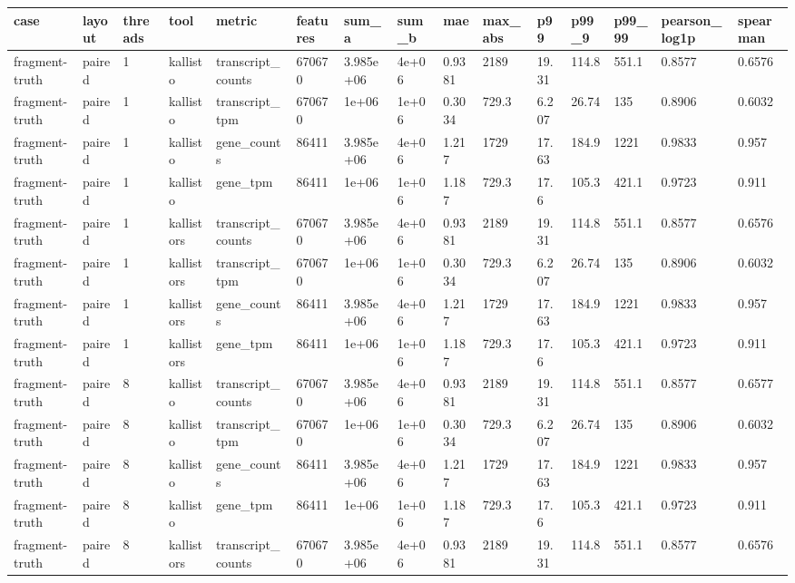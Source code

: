 \begin{tabular}{lllllllllllllll}
\toprule
case & layout & threads & tool & metric & features & sum\_a & sum\_b & mae & max\_abs & p99 & p99\_9 & p99\_99 & pearson\_log1p & spearman \\
\midrule
fragment-truth & paired & 1 & kallisto & transcript\_counts & 670670 & 3.985e+06 & 4e+06 & 0.9381 & 2189 & 19.31 & 114.8 & 551.1 & 0.8577 & 0.6576 \\
fragment-truth & paired & 1 & kallisto & transcript\_tpm & 670670 & 1e+06 & 1e+06 & 0.3034 & 729.3 & 6.207 & 26.74 & 135 & 0.8906 & 0.6032 \\
fragment-truth & paired & 1 & kallisto & gene\_counts & 86411 & 3.985e+06 & 4e+06 & 1.217 & 1729 & 17.63 & 184.9 & 1221 & 0.9833 & 0.957 \\
fragment-truth & paired & 1 & kallisto & gene\_tpm & 86411 & 1e+06 & 1e+06 & 1.187 & 729.3 & 17.6 & 105.3 & 421.1 & 0.9723 & 0.911 \\
fragment-truth & paired & 1 & kallistors & transcript\_counts & 670670 & 3.985e+06 & 4e+06 & 0.9381 & 2189 & 19.31 & 114.8 & 551.1 & 0.8577 & 0.6576 \\
fragment-truth & paired & 1 & kallistors & transcript\_tpm & 670670 & 1e+06 & 1e+06 & 0.3034 & 729.3 & 6.207 & 26.74 & 135 & 0.8906 & 0.6032 \\
fragment-truth & paired & 1 & kallistors & gene\_counts & 86411 & 3.985e+06 & 4e+06 & 1.217 & 1729 & 17.63 & 184.9 & 1221 & 0.9833 & 0.957 \\
fragment-truth & paired & 1 & kallistors & gene\_tpm & 86411 & 1e+06 & 1e+06 & 1.187 & 729.3 & 17.6 & 105.3 & 421.1 & 0.9723 & 0.911 \\
fragment-truth & paired & 8 & kallisto & transcript\_counts & 670670 & 3.985e+06 & 4e+06 & 0.9381 & 2189 & 19.31 & 114.8 & 551.1 & 0.8577 & 0.6577 \\
fragment-truth & paired & 8 & kallisto & transcript\_tpm & 670670 & 1e+06 & 1e+06 & 0.3034 & 729.3 & 6.207 & 26.74 & 135 & 0.8906 & 0.6032 \\
fragment-truth & paired & 8 & kallisto & gene\_counts & 86411 & 3.985e+06 & 4e+06 & 1.217 & 1729 & 17.63 & 184.9 & 1221 & 0.9833 & 0.957 \\
fragment-truth & paired & 8 & kallisto & gene\_tpm & 86411 & 1e+06 & 1e+06 & 1.187 & 729.3 & 17.6 & 105.3 & 421.1 & 0.9723 & 0.911 \\
fragment-truth & paired & 8 & kallistors & transcript\_counts & 670670 & 3.985e+06 & 4e+06 & 0.9381 & 2189 & 19.31 & 114.8 & 551.1 & 0.8577 & 0.6576 \\

\end{tabular}
